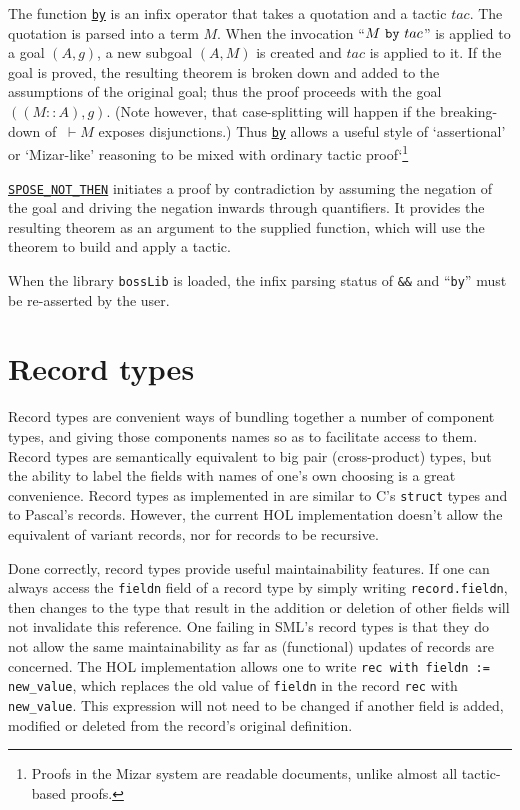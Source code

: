 The function \underline{\tt by} is an infix operator that takes a
quotation and a tactic $tac$. The quotation is parsed into a term
$M$. When the invocation ``$M\ \mbox{\tt by}\ tac$'' is applied to a
goal $(A,g)$, a new subgoal $(A,M)$ is created and $tac$ is applied to
it. If the goal is proved, the resulting theorem is broken down and
added to the assumptions of the original goal; thus the proof proceeds
with the goal $((M::A), g)$. (Note however, that case-splitting will
happen if the breaking-down of $\ \vdash M$ exposes disjunctions.) Thus
\underline{\tt by} allows a useful style  of `assertional' or
`Mizar-like' reasoning to be mixed with ordinary tactic
proof`\footnote{Proofs in the Mizar system are readable documents,
unlike almost all tactic-based proofs.}


\underline{\tt SPOSE\_NOT\_THEN} initiates a proof by
contradiction by assuming the negation of the goal and driving the
negation inwards through quantifiers. It provides the resulting theorem
as an argument to the supplied function, which will use the theorem to
build and apply a tactic.

 When the library \verb+bossLib+ is loaded, the
infix parsing status of \verb+&&+ and ``{\tt by}'' must be re-asserted
by the user.
\section{Record types}

Record types are convenient ways of bundling together a number of component
types, and giving those components names so as to facilitate access to
them.  Record types are semantically equivalent to big pair
(cross-product) types, but the ability to label the fields with names of
one's own choosing is a great convenience.  Record types as implemented
in \holn{} are similar to C's {\tt struct} types and to Pascal's records.
However, the current HOL implementation doesn't allow the equivalent of
variant records, nor for records to be recursive.

Done correctly, record types provide useful maintainability features.
If one can always access the {\tt fieldn} field of a record type by
simply writing {\tt record.fieldn}, then changes to the type that
result in the addition or deletion of other fields will not invalidate
this reference.  One failing in SML's record types is that they do not
allow the same maintainability as far as (functional) updates of
records are concerned.  The HOL implementation allows one to write
{\tt rec with fieldn := new\_value}, which replaces the old value of
{\tt fieldn} in the record {\tt rec} with {\tt new\_value}.  This
expression will not need to be changed if another field is added,
modified or deleted from the record's original definition.

